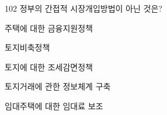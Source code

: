 \begin{question}{102}
정부의 간접적 시장개입방법이 아닌 것은?
\begin{choices}
  \item 주택에 대한 금융지원정책
  \item 토지비축정책
  \item 토지에 대한 조세감면정책
  \item 토지거래에 관한 정보체계 구축
  \item 임대주택에 대한 임대료 보조
\end{choices}
\end{question}
